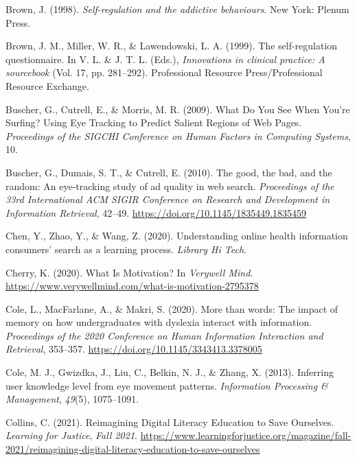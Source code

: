 \documentclass[letterpaper, nobind]{templates/ociamthesis}
\newlength{\cslhangindent}
\newenvironment{CSLReferences}[2] %
 {%
  \setlength{\parindent}{0pt}
  \ifodd #1
  \let\oldpar\par
  \def\par{\hangindent=\cslhangindent\oldpar}
  \fi
  \setlength{\parskip}{1mm}
  \setlength{\baselineskip}{6mm}
 }%
 {}
\begin{document}
\begin{CSLReferences}{1}{0}
\leavevmode{}%
Brown, J. (1998). \emph{Self-regulation and the addictive behaviours}. New York: Plenum Press.

\leavevmode{}%
Brown, J. M., Miller, W. R., \& Lawendowski, L. A. (1999). The self-regulation questionnaire. In V. L. \& J. T. L. (Eds.), \emph{Innovations in clinical practice: A sourcebook} (Vol. 17, pp. 281--292). Professional Resource Press/Professional Resource Exchange.

\leavevmode{}%
Buscher, G., Cutrell, E., \& Morris, M. R. (2009). What {Do You See When You}'re {Surfing}? {Using Eye Tracking} to {Predict Salient Regions} of {Web Pages}. \emph{Proceedings of the SIGCHI Conference on Human Factors in Computing Systems}, 10.

\leavevmode{}%
Buscher, G., Dumais, S. T., \& Cutrell, E. (2010). The good, the bad, and the random: {An} eye-tracking study of ad quality in web search. \emph{Proceedings of the 33rd International {ACM SIGIR} Conference on Research and Development in Information Retrieval}, 42--49. \url{https://doi.org/10.1145/1835449.1835459}

\leavevmode{}%
Chen, Y., Zhao, Y., \& Wang, Z. (2020). Understanding online health information consumers' search as a learning process. \emph{Library Hi Tech}.

\leavevmode{}%
Cherry, K. (2020). What {Is Motivation}? In \emph{Verywell Mind}. \url{https://www.verywellmind.com/what-is-motivation-2795378}

\leavevmode{}%
Cole, L., MacFarlane, A., \& Makri, S. (2020). More than words: The impact of memory on how undergraduates with dyslexia interact with information. \emph{Proceedings of the 2020 Conference on Human Information Interaction and Retrieval}, 353--357. \url{https://doi.org/10.1145/3343413.3378005}

\leavevmode{}%
Cole, M. J., Gwizdka, J., Liu, C., Belkin, N. J., \& Zhang, X. (2013). Inferring user knowledge level from eye movement patterns. \emph{Information Processing \& Management}, \emph{49}(5), 1075--1091.

\leavevmode{}%
Collins, C. (2021). Reimagining {Digital Literacy Education} to {Save Ourselves}. \emph{Learning for Justice}, \emph{Fall 2021}. \url{https://www.learningforjustice.org/magazine/fall-2021/reimagining-digital-literacy-education-to-save-ourselves}


\end{CSLReferences}
\end{document}
